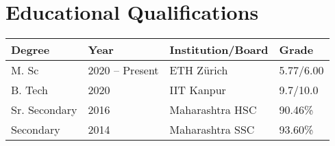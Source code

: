 \section*{Educational Qualifications}
\begin{tabulary}{\textwidth}{L L L L}

\toprule
\textbf{Degree} & \textbf{Year} & \textbf{Institution/Board} & \textbf{Grade}\\
\midrule
M. Sc & 2020 -- Present & ETH Zürich & 5.77/6.00\\%
B. Tech & 2020 & IIT Kanpur & 9.7/10.0\\
Sr. Secondary & 2016 & Maharashtra HSC & 90.46\%\\
Secondary & 2014 & Maharashtra SSC & 93.60\%\\
\bottomrule

\end{tabulary}
